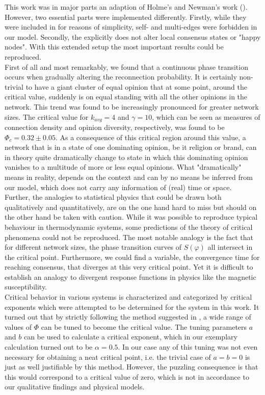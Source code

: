 \documentclass[11pt]{article}
\begin{document}
This work was in major parts an adaption of Holme's and Newman's work (\cite{main paper}). However, two essential parts were implemented differently. Firstly, while they were included in \cite{main paper} for reasons of simplicity, self- and multi-edges were forbidden in our model. Secondly, the explicitly does not alter local consensus states or "happy nodes". With this extended setup the most important results could be reproduced.\\


First of all and most remarkably, we found that a continuous phase transition occurs when gradually altering the reconnection probability. It is certainly non-trivial to have a giant cluster of equal opinion that at some point, around the critical value, suddenly is on equal standing with all the other opinions in the network. This trend was found to be increasingly pronounced for greater network sizes. The critical value for $k_{avg}=4$ and $\gamma=10$, which can be seen as measures of connection density and opinion diversity, respectively, was found to be $\Phi_c=0.32 \pm 0.05$. As a consequence of this critical region around this value, a network that is in a state of one dominating opinion, be it religion or brand, can in theory quite dramatically change to state in which this dominating opinion vanishes to a multitude of more or less equal opinions. What "dramatically" means in reality, depends on the context and can by no means be inferred from our model, which does not carry any information of (real) time or space.\\


Further, the analogies to statistical physics that could be drawn both qualitatively and quantitatively, are on the one hand hard to miss but should on the other hand be taken with caution. While it was possible to reproduce typical behaviour in thermodynamic systems, some predictions of the theory of critical phenomena could not be reproduced. The most notable analogy is the fact that for different network sizes, the phase transition curves of $S(\varphi)$ all intersect in the critical point. Furthermore, we could find a variable, the convergence time for reaching consensus, that diverges at this very critical point. Yet it is difficult to establish an analogy to divergent response functions in physics like the magnetic susceptibility. \\


Critical behavior in various systems is characterized and categorized by critical exponents which were attempted to be determined for the system in this work. It turned out that by strictly following the method suggested in \cite{main paper}, a wide range of values of $\Phi$ can be tuned to become the critical value. The tuning parameters $a$ and $b$ can be used to calculate a critical exponent, which in our exemplary calculation turned out to be $\alpha = 0.5$. In our case any of this tuning was not even necessary for obtaining a neat critical point, i.e. the trivial case of $a=b=0$ is just as well justifiable by this method. However, the puzzling consequence is that this would correspond to a critical value of zero, which is not in accordance to our qualitative findings and physical models.\\
\end{document}
